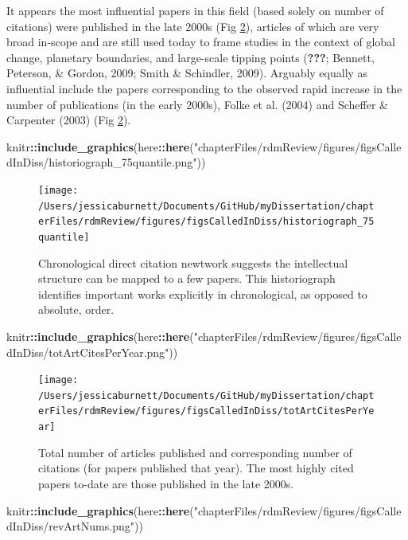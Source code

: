 \documentclass[12pt,twoside,openany]{reedthesis}
\newenvironment{Shaded}{\begin{snugshade}}{\end{snugshade}}
\newcommand{\KeywordTok}[1]{\textcolor[rgb]{0.13,0.29,0.53}{\textbf{#1}}}
\newcommand{\NormalTok}[1]{#1}
\newcommand{\OperatorTok}[1]{\textcolor[rgb]{0.81,0.36,0.00}{\textbf{#1}}}
\newcommand{\StringTok}[1]{\textcolor[rgb]{0.31,0.60,0.02}{#1}}
\begin{document}
It appears the most influential papers in this field (based solely on number of citations) were published in the late 2000s (Fig \ref{fig:totArtCitesPerYear}), articles of which are very broad in-scope and are still used today to frame studies in the context of global change, planetary boundaries, and large-scale tipping points ({\textbf{???}}; Bennett, Peterson, \& Gordon, 2009; Smith \& Schindler, 2009). Arguably equally as influential include the papers corresponding to the observed rapid increase in the number of publications (in the early 2000s), Folke et al. (2004) and Scheffer \& Carpenter (2003) (Fig \ref{fig:totArtCitesPerYear}).
\begin{Shaded}
\begin{Highlighting}[]
\NormalTok{knitr}\OperatorTok{::}\KeywordTok{include_graphics}\NormalTok{(here}\OperatorTok{::}\KeywordTok{here}\NormalTok{(}\StringTok{"chapterFiles/rdmReview/figures/figsCalledInDiss/historiograph_75quantile.png"}\NormalTok{))}
\end{Highlighting}
\end{Shaded}
\begin{figure}
\texttt{[image: /Users/jessicaburnett/Documents/GitHub/myDissertation/chapterFiles/rdmReview/figures/figsCalledInDiss/historiograph\_75quantile]} \caption{Chronological direct citation newtwork suggests the intellectual structure can be mapped to a few papers. This historiograph identifies important works explicitly in chronological, as opposed to absolute, order.}\label{fig:historiograph}
\end{figure}
\begin{Shaded}
\begin{Highlighting}[]
\NormalTok{knitr}\OperatorTok{::}\KeywordTok{include_graphics}\NormalTok{(here}\OperatorTok{::}\KeywordTok{here}\NormalTok{(}\StringTok{"chapterFiles/rdmReview/figures/figsCalledInDiss/totArtCitesPerYear.png"}\NormalTok{))}
\end{Highlighting}
\end{Shaded}
\begin{figure}
\texttt{[image: /Users/jessicaburnett/Documents/GitHub/myDissertation/chapterFiles/rdmReview/figures/figsCalledInDiss/totArtCitesPerYear]} \caption{Total number of articles published and corresponding number of citations (for papers published that year). The most highly cited papers to-date are those published in the late 2000s.}\label{fig:totArtCitesPerYear}
\end{figure}
\begin{Shaded}
\begin{Highlighting}[]
\NormalTok{knitr}\OperatorTok{::}\KeywordTok{include_graphics}\NormalTok{(here}\OperatorTok{::}\KeywordTok{here}\NormalTok{(}\StringTok{"chapterFiles/rdmReview/figures/figsCalledInDiss/revArtNums.png"}\NormalTok{))}
\end{Highlighting}
\end{Shaded}
\end{document}
